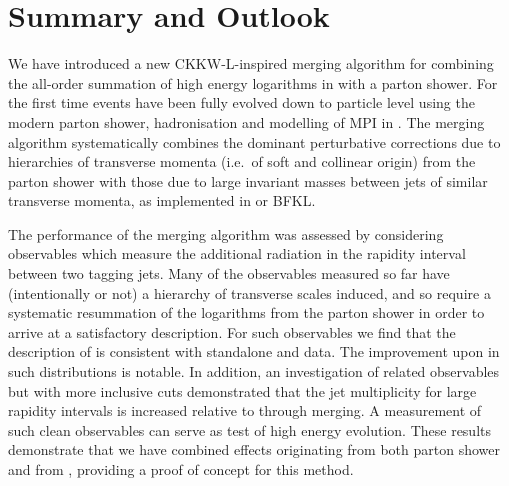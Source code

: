 \section{Summary and Outlook}
\label{sec:outlook}

We have introduced a new CKKW-L-inspired merging algorithm for combining the
all-order summation of high energy logarithms in \HEJ with a parton shower.  
For the first time
\HEJ events have been fully evolved down to particle level using the modern
parton shower, hadronisation and modelling of MPI in \py. The merging
algorithm systematically combines the dominant perturbative
corrections due to hierarchies of transverse momenta (i.e.~of soft and
collinear origin) from the parton shower with those due to large invariant
masses between jets of similar transverse momenta, as implemented in \HEJ or
BFKL.

The performance of the merging algorithm was assessed by considering observables which measure the additional radiation in the rapidity interval between two tagging jets. 
Many of the observables measured so far have (intentionally or not) a hierarchy of transverse scales
induced, and so require a systematic resummation of the
logarithms from the parton shower in order to arrive at a satisfactory
description. For such observables we find that 
the description of \HEJpy is consistent with standalone \pyt and data.
The improvement upon \HEJ in such distributions is notable. 
In addition, an investigation of related observables but with more inclusive cuts demonstrated that 
the jet multiplicity for large rapidity intervals is increased relative to
\pyt through merging. A measurement of such clean observables can serve as
test of high energy evolution.
These results demonstrate that we have combined effects originating from both parton shower and from \HEJ, providing a proof of concept for this method.


